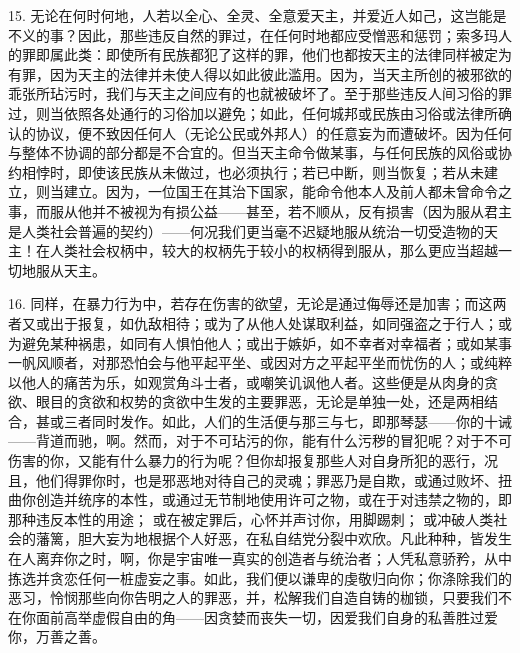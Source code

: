 15. 无论在何时何地，人若以全心、全灵、全意爱天主，并爱近人如己，这岂能是不义的事？因此，那些违反自然的罪过，在任何时地都应受憎恶和惩罚；索多玛人的罪即属此类：即使所有民族都犯了这样的罪，他们也都按天主的法律同样被定为有罪，因为天主的法律并未使人得以如此彼此滥用。因为，当天主所创的被邪欲的乖张所玷污时，我们与天主之间应有的也就被破坏了。至于那些违反人间习俗的罪过，则当依照各处通行的习俗加以避免；如此，任何城邦或民族由习俗或法律所确认的协议，便不致因任何人（无论公民或外邦人）的任意妄为而遭破坏。因为任何与整体不协调的部分都是不合宜的。但当天主命令做某事，与任何民族的风俗或协约相悖时，即使该民族从未做过，也必须执行；若已中断，则当恢复；若从未建立，则当建立。因为，一位国王在其治下国家，能命令他本人及前人都未曾命令之事，而服从他并不被视为有损公益——甚至，若不顺从，反有损害（因为服从君主是人类社会普遍的契约）——何况我们更当毫不迟疑地服从统治一切受造物的天主！在人类社会权柄中，较大的权柄先于较小的权柄得到服从，那么更应当超越一切地服从天主。\par

16. 同样，在暴力行为中，若存在伤害的欲望，无论是通过侮辱还是加害；而这两者又或出于报复，如仇敌相待；或为了从他人处谋取利益，如同强盗之于行人；或为避免某种祸患，如同有人惧怕他人；或出于嫉妒，如不幸者对幸福者；或如某事一帆风顺者，对那恐怕会与他平起平坐、或因对方之平起平坐而忧伤的人；或纯粹以他人的痛苦为乐，如观赏角斗士者，或嘲笑讥讽他人者。这些便是从肉身的贪欲、眼目的贪欲和权势的贪欲中生发的主要罪恶，无论是单独一处，还是两相结合，甚或三者同时发作。如此，人们的生活便与那三与七，即那琴瑟——你的十诫——背道而驰，啊。然而，对于不可玷污的你，能有什么污秽的冒犯呢？对于不可伤害的你，又能有什么暴力的行为呢？但你却报复那些人对自身所犯的恶行，况且，他们得罪你时，也是邪恶地对待自己的灵魂；罪恶乃是自欺，或通过败坏、扭曲你创造并统序的本性，或通过无节制地使用许可之物，或在于对违禁之物的，即那种违反本性的用途； 或在被定罪后，心怀并声讨你，用脚踢刺； 或冲破人类社会的藩篱，胆大妄为地根据个人好恶，在私自结党分裂中欢欣。凡此种种，皆发生在人离弃你之时，啊，你是宇宙唯一真实的创造者与统治者；人凭私意骄矜，从中拣选并贪恋任何一桩虚妄之事。如此，我们便以谦卑的虔敬归向你；你涤除我们的恶习，怜悯那些向你告明之人的罪恶，并，松解我们自造自铸的枷锁，只要我们不在你面前高举虚假自由的角——因贪婪而丧失一切，因爱我们自身的私善胜过爱你，万善之善。\par


